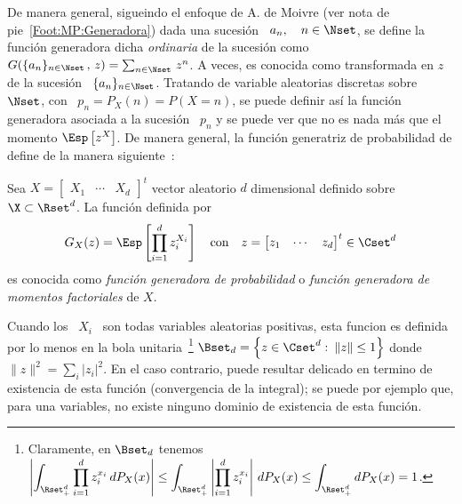 De  manera  general,  sigueindo  el  enfoque  de A.   de  Moivre  (ver  nota  de
pie~\ref{Foot:MP:Generadora}) dada una sucesi\'on \ $a_n, \quad n \in \Nset$, se
define la funci\'on generadora dicha {\em ordinaria} de la sucesi\'on como $G(\{
a_n \}_{n  \in \Nset}  \, ,  \, z)  = \sum_{n \in  \Nset} \,  z^n$. A  veces, es
conocida  como  transformada  en $z$  de  la  sucesi\'on  \  $\{ a_n  \}_{n  \in
  \Nset}$. Tratando de variable aleatorias discretas sobre \ $\Nset$, con \ $p_n
= P_X(n) = P(X = n)$, se  puede definir as\'i la funci\'on generadora asociada a
la sucesi\'on \ $p_n$ y se puede ver que no
es nada  m\'as que el momento  $\Esp\left[ z^X \right]$.  De  manera general, la
funci\'on    generatriz   de    probabilidad    de   define    de   la    manera
siguiente~\cite{Fel68, JohKot97, Muk00, AthLah06}:
%
\begin{definicion}\label{Def:MP:GeneradoraProbabilidadFactorial}
  Sea $X = \begin{bmatrix} X_1  & \cdots & X_d \end{bmatrix}^t$ vector aleatorio
  $d$ dimensional  definido sobre $\X  \subset \Rset^d$.  La  funci\'on definida
  por
  \[
  G_X(z) =  \Esp\left[ \prod_{i=1}^d  z_i^{X_i} \right]\quad \mbox{con}  \quad z
  = \begin{bmatrix} z_1 & \cdots & z_d \end{bmatrix}^t \in \Cset^d
  \]
  es conocida como  {\em funci\'on generadora de probabilidad}  o {\em funci\'on
    generadora de momentos factoriales} de $X$.
\end{definicion}
%
\noindent Cuando  los \ $X_i$ \  son todas variables  aleatorias positivas, esta
funcion es  definida por lo  menos en la bola  unitaria~\footnote{Claramente, en
  $\Bset_d$   tenemos  $\displaystyle   \left|   \int_{\Rset_+^d}  \prod_{i=1}^d
    z_i^{x_i}  \,  dP_X(x)  \right|  \le \int_{\Rset_+^d}  \left|  \prod_{i=1}^d
    z_i^{x_i} \right| \, dP_X(x) \le \int_{\Rset_+^d} dP_X(x) = 1$.}  $\Bset_d =
\left\{ z  \in \Cset^d: \:  \| z \|  \le 1 \right\}$ donde  $\| z \|^2  = \sum_i
|z_i|^2$. En el caso contrario, puede resultar delicado en termino de existencia
de esta funci\'on (convergencia de la  integral); se puede por ejemplo que, para
una variables, no existe ninguno dominio de existencia de esta funci\'on.

